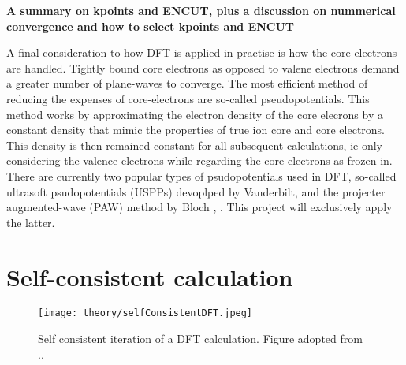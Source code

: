 \textbf{A summary on kpoints and ENCUT, plus a discussion on nummerical convergence and how to select kpoints and ENCUT}


A final consideration to how DFT is applied in practise is how the core electrons are handled. Tightly bound core electrons as opposed to valene electrons demand a greater number of plane-waves to converge. The most efficient method of reducing the expenses of core-electrons are so-called pseudopotentials. This method works by approximating the electron density of the core elecrons by a constant density that mimic the properties of true ion core and core electrons. This density is then remained constant for all subsequent calculations, ie only considering the valence electrons while regarding the core electrons as frozen-in. There are currently two popular types of psudopotentials used in DFT, so-called ultrasoft psudopotentials (USPPs) devoplped by Vanderbilt, and the projecter augmented-wave (PAW) method by Bloch \cite{PAW1}, \cite{PAW2}. This project will exclusively apply the latter. 

\section{Self-consistent calculation}

\begin{figure}
\centering
\texttt{[image: theory/selfConsistentDFT.jpeg]}
\caption{Self consistent iteration of a DFT calculation. Figure adopted from ..}
\label{sfDFT}
\end{figure}